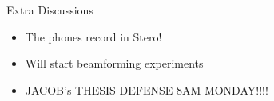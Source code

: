\begin{frame}{Extra Discussions}
    \begin{itemize}
        \item The phones record in Stero!
        \item Will start beamforming experiments
        \item JACOB's THESIS DEFENSE 8AM MONDAY!!!!
    \end{itemize}
\end{frame}

